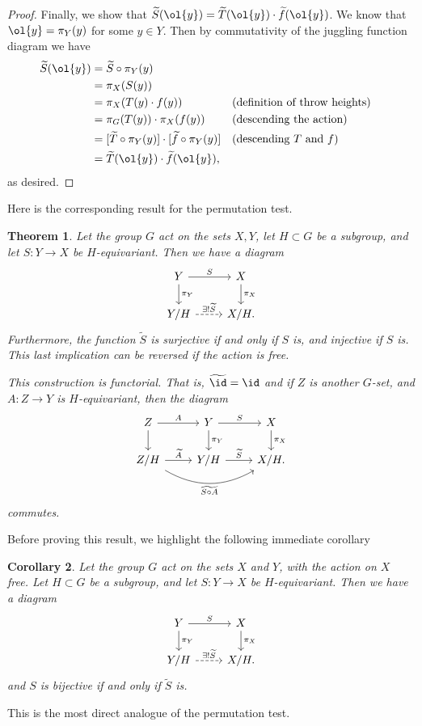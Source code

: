 \documentclass[12nt]{article}
\theoremstyle{plain}
\newtheorem{theorem}{Theorem}
\newtheorem{corollary}[theorem]{Corollary}
\begin{document}
\begin{proof}
Finally, we show that $\widetilde{S}(\ol{y}) = \widetilde{T}(\ol{y}) \cdot \widetilde{f}(\ol{y})$. We know that $\ol{y} = \pi_Y(y)$ for some $y \in Y$. Then by commutativity of the juggling function diagram we have
\begin{align*}
\widetilde{S}(\ol{y}) &= \widetilde{S} \circ \pi_Y(y) \\
	&= \pi_X(S(y)) \\
	&= \pi_X(T(y) \cdot f(y)) &&\text{(definition of throw heights)}\\
	&= \pi_G(T(y)) \cdot \pi_X(f(y)) && \text{(descending the action)} \\
	&= [\widetilde{T} \circ \pi_Y(y)] \cdot [\widetilde{f} \circ \pi_Y(y)] && \text{(descending $T$ and $f$)} \\
	&= \widetilde{T}(\ol{y}) \cdot \widetilde{f}(\ol{y}),
\end{align*}
as desired.



\end{proof}

Here is the corresponding result for the permutation test.
\begin{theorem}\label{permutation_test}
Let the group $G$ act on the sets $X, Y$, let $H \subset G$ be a subgroup, and let $S : Y \to X$ be $H$-equivariant. Then we have a diagram
\[
\begin{tikzcd}
Y \ar[r, "S"] \ar[d, "\pi_Y"] & X \ar[d, "\pi_X"]\\
Y/H \ar[r, dashed, "\exists ! \widetilde{S}"] & X/H.
\end{tikzcd}
\]
Furthermore, the function $\widetilde{S}$ is surjective if and only if $S$ is, and injective if $S$ is. This last implication can be reversed if the action is free. 

This construction is functorial. That is, $\widetilde{\id} = \id$ and if $Z$ is another $G$-set, and $A : Z \to Y$ is $H$-equivariant, then the diagram
\[
\begin{tikzcd}
Z \ar[r, "A"] \ar[d] & Y \ar[r, "S"] \ar[d, "\pi_Y"] & X \ar[d, "\pi_X"]\\
Z/H \ar[r, "\widetilde{A}"] \ar[rr, bend right, "\widetilde{S \circ A}"'] & Y/H \ar[r, "\widetilde{S}"] & X/H.
\end{tikzcd}
\]
commutes.
\end{theorem}
Before proving this result, we highlight the following immediate corollary

\begin{corollary}
Let the group $G$ act on the sets $X$ and $Y$, with the action on $X$ free. Let $H \subset G$ be a subgroup, and let $S : Y \to X$ be $H$-equivariant. Then we have a diagram
\[
\begin{tikzcd}
Y \ar[r, "S"] \ar[d, "\pi_Y"] & X \ar[d, "\pi_X"]\\
Y/H \ar[r, dashed, "\exists ! \widetilde{S}"] & X/H.
\end{tikzcd}
\]
and $S$ is bijective if and only if $\widetilde{S}$ is.
\end{corollary}
This is the most direct analogue of the permutation test. 
\end{document}
